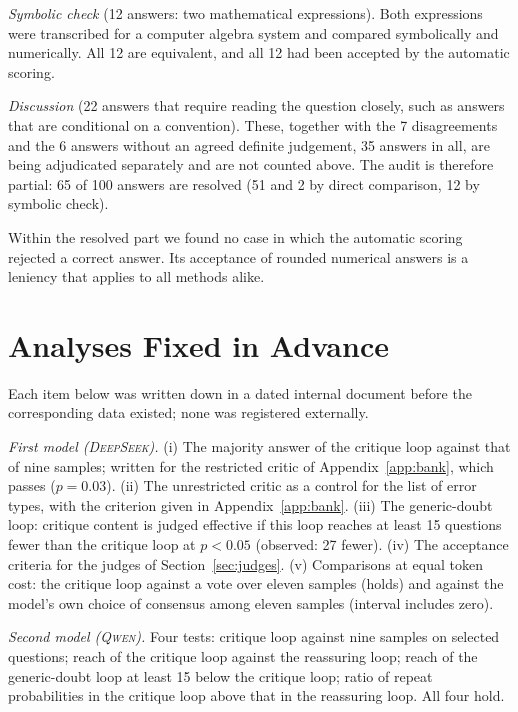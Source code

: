 \documentclass[11pt]{article}
\newcommand{\ds}{\textsc{DeepSeek}}
\newcommand{\qw}{\textsc{Qwen}}
\begin{document}
\emph{Symbolic check} (12 answers: two mathematical expressions).
Both expressions were transcribed for a computer algebra system and compared symbolically and numerically.
All 12 are equivalent, and all 12 had been accepted by the automatic scoring.

\emph{Discussion} (22 answers that require reading the question closely, such as answers that are conditional on a convention).
These, together with the 7 disagreements and the 6 answers without an agreed definite judgement, 35 answers in all, are being adjudicated separately and are not counted above.
The audit is therefore partial: 65 of 100 answers are resolved (51 and 2 by direct comparison, 12 by symbolic check).

Within the resolved part we found no case in which the automatic scoring rejected a correct answer.
Its acceptance of rounded numerical answers is a leniency that applies to all methods alike.

\section{Analyses Fixed in Advance}
\label{app:prereg}

Each item below was written down in a dated internal document before the corresponding data existed; none was registered externally.

\emph{First model (\ds).}
(i) The majority answer of the critique loop against that of nine samples; written for the restricted critic of Appendix~\ref{app:bank}, which passes ($p=0.03$).
(ii) The unrestricted critic as a control for the list of error types, with the criterion given in Appendix~\ref{app:bank}.
(iii) The generic-doubt loop: critique content is judged effective if this loop reaches at least 15 questions fewer than the critique loop at $p<0.05$ (observed: 27 fewer).
(iv) The acceptance criteria for the judges of Section~\ref{sec:judges}.
(v) Comparisons at equal token cost: the critique loop against a vote over eleven samples (holds) and against the model's own choice of consensus among eleven samples (interval includes zero).

\emph{Second model (\qw).}
Four tests: critique loop against nine samples on selected questions; reach of the critique loop against the reassuring loop; reach of the generic-doubt loop at least 15 below the critique loop; ratio of repeat probabilities in the critique loop above that in the reassuring loop.
All four hold.
\end{document}
